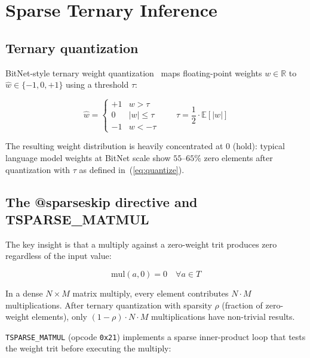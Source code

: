 \documentclass[11pt,a4paper]{article}
\begin{document}
\section{Sparse Ternary Inference}
\label{sec:sparse}

\subsection{Ternary quantization}

BitNet-style ternary weight quantization~\cite{ma2024era} maps floating-point
weights $w \in \mathbb{R}$ to $\hat{w} \in \{-1, 0, +1\}$ using a threshold
$\tau$:

\begin{equation}
  \hat{w} = \begin{cases}
    +1 & w >  \tau \\
     0 & |w| \leq \tau \\
    -1 & w < -\tau
  \end{cases}
  \qquad \tau = \frac{1}{2} \cdot \mathbb{E}[|w|]
  \label{eq:quantize}
\end{equation}

The resulting weight distribution is heavily concentrated at $0$ (hold):
typical language model weights at BitNet scale show $55$–$65\%$ zero elements
after quantization with $\tau$ as defined in~(\ref{eq:quantize}).

\subsection{The @sparseskip directive and TSPARSE\_MATMUL}

The key insight is that a multiply against a zero-weight trit produces zero
regardless of the input value:

\begin{equation}
  \mathrm{mul}(a, 0) = 0 \quad \forall a \in T
  \label{eq:zero-mul}
\end{equation}

In a dense $N \times M$ matrix multiply, every element contributes
$N \cdot M$ multiplications. After ternary quantization with sparsity $\rho$
(fraction of zero-weight elements), only $(1-\rho) \cdot N \cdot M$
multiplications have non-trivial results.

\texttt{TSPARSE\_MATMUL} (opcode \texttt{0x21}) implements a sparse
inner-product loop that tests the weight trit before executing the multiply:
\end{document}
